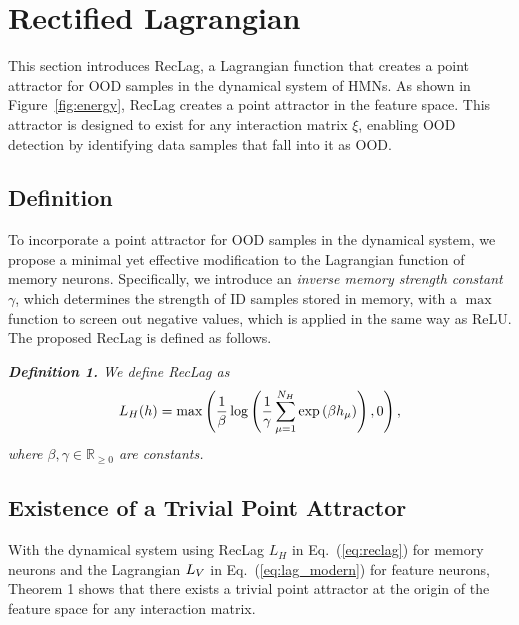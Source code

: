 
\section{Rectified Lagrangian}

This section introduces RecLag, a Lagrangian function that creates a point attractor for OOD samples in the dynamical system of HMNs.
As shown in Figure~\ref{fig:energy},
RecLag creates a point attractor in the feature space.
This attractor is designed to exist for any interaction matrix $\xi$, enabling OOD detection by identifying data samples that fall into it as OOD.

\subsection{Definition}

To incorporate a point attractor for OOD samples in the dynamical system, we propose a minimal yet effective modification to the Lagrangian function of memory neurons.
Specifically, we introduce an {\it inverse memory strength constant} $\gamma$, which determines the strength of ID samples stored in memory, with a $\max$ function to screen out negative values, which is applied in the same way as ReLU.
The proposed RecLag is defined as follows.

\vspace{5pt}
\noindent \textit{\textbf{Definition 1.}
We define RecLag as
\begin{align}
\label{eq:reclag}
L_{H}(h) = \max \left(
\frac{1}{\beta}
\log \left( \frac{1}{\gamma} \sum^{N_{H}}_{\mu=1} \exp \left({\beta h_{\mu}}\right) \right), 0 \right),
\end{align}
where $\beta, \gamma \in \mathbb{R}_{\ge 0}$ are constants.
}

\subsection{Existence of a Trivial Point Attractor}
With the dynamical system using RecLag $L_{H}$ in Eq.~(\ref{eq:reclag}) for memory neurons and the Lagrangian $L_{V}$ in Eq.~(\ref{eq:lag_modern}) for feature neurons, Theorem 1 shows that there exists a trivial point attractor at the origin of the feature space for any interaction matrix.

